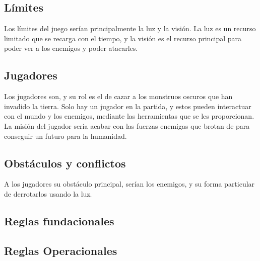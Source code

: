     \subsection{Límites}
        Los límites del juego serían principalmente la luz y la visión. La luz es un recurso limitado que se recarga con el tiempo, y la visión es el recurso principal para poder ver a los enemigos y poder atacarles.

    \subsection{Jugadores}
        Los jugadores son\hunters, y su rol es el de cazar a los monstruos oscuros que han invadido la tierra. Solo hay un jugador en la partida, y estos pueden interactuar con el mundo y los enemigos, mediante las herramientas que se les proporcionan.
        La misión del jugador sería acabar con las fuerzas enemigas que brotan de \hole para conseguir un futuro para la humanidad.

    \subsection{Obstáculos y conflictos}
        A los jugadores su obstáculo principal, serían los enemigos, y su forma particular de derrotarlos usando la luz.
    \subsection{Reglas fundacionales}

    \subsection{Reglas Operacionales}


